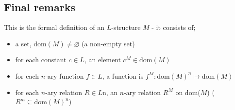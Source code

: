\documentclass[a4paper, 12pt]{article}
\renewcommand{\emptyset}[0]{\varnothing}
\begin{document}
        \subsection*{Final remarks}
            This is the formal definition of an $L$-structure $M$ - it consists of;
            \begin{itemize}
                \itemsep0em
                \item a set, $\text{dom}(M) \neq \emptyset$ (a non-empty set)
                \item for each constant $c \in L$, an element $c^M \in \text{dom}(M)$
                \item for each $n$-ary function $f \in L$, a function is $f^M: \text{dom}(M)^n \mapsto \text{dom}(M)$
                \item for each $n$-ary relation $R \in L$n, an $n$-ary relation $R^M$ on dom($M$) ($R^m \subseteq \text{dom}(M)^n$)
            \end{itemize}
\end{document}
